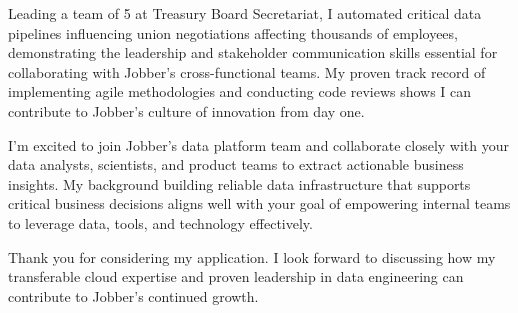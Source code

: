 \documentclass[11pt, letterpaper]{awesome-cv}
\begin{document}
\begin{cvletter}
Leading a team of 5 at Treasury Board Secretariat, I automated critical data pipelines influencing union negotiations affecting thousands of employees, demonstrating the leadership and stakeholder communication skills essential for collaborating with Jobber's cross-functional teams. My proven track record of implementing agile methodologies and conducting code reviews shows I can contribute to Jobber's culture of innovation from day one.

I'm excited to join Jobber's data platform team and collaborate closely with your data analysts, scientists, and product teams to extract actionable business insights. My background building reliable data infrastructure that supports critical business decisions aligns well with your goal of empowering internal teams to leverage data, tools, and technology effectively.

Thank you for considering my application. I look forward to discussing how my transferable cloud expertise and proven leadership in data engineering can contribute to Jobber's continued growth.
\end{cvletter}


\makeletterclosing%
\end{document}
